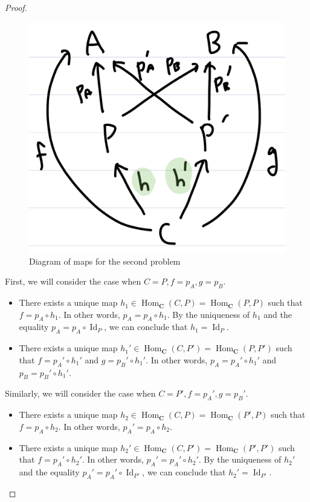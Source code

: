 \documentclass[12pt, psamsfonts]{amsart}
\theoremstyle{definition}
\theoremstyle{remark}
\DeclareMathOperator{\Hom}{Hom}
\DeclareMathOperator{\Id}{Id}
\numberwithin{equation}{section}
\begin{document}
\begin{proof}
  \begin{figure}
    \includegraphics[width=\linewidth]{maps.jpeg}
      \caption{Diagram of maps for the second problem}
    \label{fig:maps}
  \end{figure}

  First, we will consider the case when $C = P, f = p_A, g = p_B$.

  \begin{itemize}
    \item
      There exists a unique map $h_1 \in \Hom_{\mathbf{C}}(C, P) = \Hom_{\mathbf{C}}(P, P)$ such that $f = p_A \circ h_1$.
      In other words, $p_A = p_A \circ h_1$.
      By the uniqueness of $h_1$ and the equality $p_A = p_A \circ \Id_P$, we can conclude that $h_1 = \Id_P$.
    \item
      There exists a unique map $h_1' \in \Hom_{\mathbf{C}}(C, P') = \Hom_{\mathbf{C}}(P, P')$ such that $f = p_A' \circ h_1'$ and $g = p_B' \circ h_1'$.
      In other words, $p_A = p_A' \circ h_1'$ and $p_B = p_B' \circ h_1'$.
  \end{itemize}


  Similarly, we will consider the case when $C = P', f = p_A', g = p_B'$.

  \begin{itemize}
    \item
      There exists a unique map $h_2 \in \Hom_{\mathbf{C}}(C, P) = \Hom_{\mathbf{C}}(P', P)$ such that $f = p_A \circ h_2$.
      In other words, $p_A' = p_A \circ h_2$.
    \item
      There exists a unique map $h_2' \in \Hom_{\mathbf{C}}(C, P') = \Hom_{\mathbf{C}}(P', P')$ such that $f = p_A' \circ h_2'$.
      In other words, $p_A' = p_A' \circ h_2'$.
      By the uniqueness of $h_2'$ and the equality $p_A' = p_A' \circ \Id_{P'}$, we can conclude that $h_2' = \Id_{P'}$.
  \end{itemize}


\end{proof}
\end{document}
